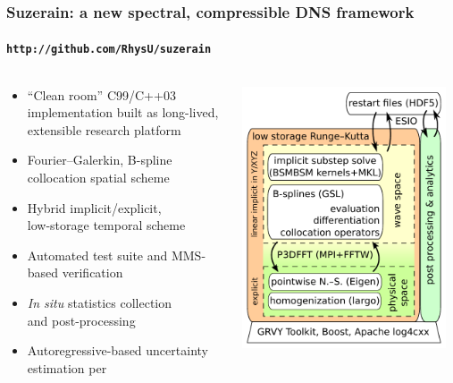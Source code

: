 \documentclass[mathserif]{beamer}
\begin{document}
\begin{frame}
\frametitle{Suzerain: a new spectral, compressible DNS framework}
\framesubtitle{\texttt{http://github.com/RhysU/suzerain}}
\vspace{-1.5em}
\begin{columns}[t]
\begin{column}{.50\textwidth}
\begin{small}
\begin{itemize}
  \item ``Clean room'' C99/C++03 implementation
        built as long-lived, extensible research platform
  \item Fourier--Galerkin, B-spline collocation spatial scheme
  \item Hybrid implicit/explicit,\\low-storage temporal scheme\\
        \citep{spalart_lowstoragerk}
  \item Automated test suite and MMS-based verification\\
        \citep{Ulerich2012MMS}
  \item \emph{In situ} statistics collection\\and post-processing
  \item Autoregressive-based uncertainty estimation per~\citet{Oliver2014Estimating}
\end{itemize}
\end{small}
\end{column}
\begin{column}{.50\textwidth}
  \vspace{-1em}
  \begin{center}
    \includegraphics[width=0.95\textwidth]{SuzerainDesignOverview}

\end{center}
\end{column}
\end{columns}
\end{frame}
\end{document}
